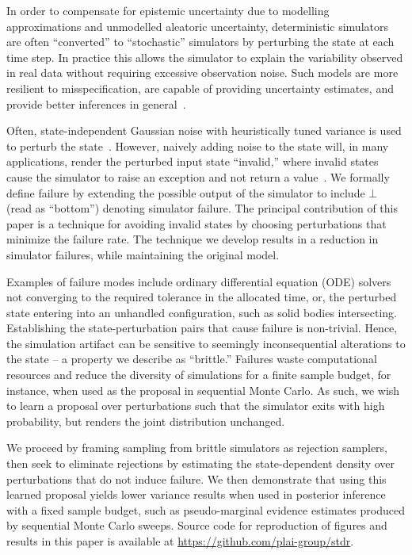 
In order to compensate for epistemic uncertainty due to modelling approximations and unmodelled aleatoric uncertainty, deterministic simulators are often ``converted'' to ``stochastic'' simulators by perturbing the state at each time step.
In practice this allows the simulator to explain the variability observed in real data without requiring excessive observation noise.
Such models are more resilient to misspecification, are capable of providing uncertainty estimates, and provide better inferences in general~\citep{moller2011parameter, Saarinen2008hh, LV200874, stochchem, renard2013stochastic}.

Often, state-independent Gaussian noise with heuristically tuned variance is used to perturb the state~\citep{adhikari2013introductory, brockwell2016introduction, fox1997stochastic, reddy2016simulating, du2006dynamics, allen2017primer, Mbalawata2013}.
However, naively adding noise to the state will, in many applications, render the perturbed input state ``invalid,''
where invalid states cause the simulator to raise an exception and not return a value~\citep{RAZAVI201995, lucas2013failure, gmd2019crash}. 
We formally define failure by extending the possible output of the simulator to include $\bot$ (read as ``bottom'') denoting simulator failure.
The principal contribution of this paper is a technique for avoiding invalid states by choosing perturbations that minimize the failure rate.
The technique we develop results in a reduction in simulator failures, while maintaining the original model.

Examples of failure modes include ordinary differential equation (ODE) solvers not converging to the required tolerance in the allocated time, or, the perturbed state entering into an unhandled configuration, such as solid bodies intersecting.
Establishing the state-perturbation pairs that cause failure is non-trivial.
Hence, the simulation artifact can be sensitive to seemingly inconsequential alterations to the state -- a property we describe as ``brittle.'' 
Failures waste computational resources and reduce the diversity of simulations for a finite sample budget, for instance, when used as the proposal in sequential Monte Carlo.
As such, we wish to learn a proposal over perturbations such that the simulator exits with high probability, but renders the joint distribution unchanged.

We proceed by framing sampling from brittle simulators as rejection samplers, then seek to eliminate rejections by estimating the state-dependent density over perturbations that do not induce failure.
We then demonstrate that using this learned proposal yields lower variance results when used in posterior inference with a fixed sample budget, such as pseudo-marginal evidence estimates produced by sequential Monte Carlo sweeps.
Source code for reproduction of figures and results in this paper is available at \url{https://github.com/plai-group/stdr}.
